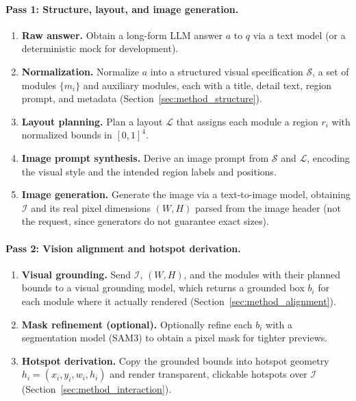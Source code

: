 \paragraph{Pass 1: Structure, layout, and image generation.}
\begin{enumerate}[leftmargin=*,topsep=2pt,itemsep=1pt]
    \item \textbf{Raw answer.} Obtain a long-form LLM answer $a$ to $q$ via a
    text model (or a deterministic mock for development).
    \item \textbf{Normalization.} Normalize $a$ into a structured visual
    specification $\mathcal{S}$, a set of modules $\{m_i\}$ and auxiliary
    modules, each with a title, detail text, region prompt, and metadata
    (Section~\ref{sec:method_structure}).
    \item \textbf{Layout planning.} Plan a layout $\mathcal{L}$ that assigns
    each module a region $r_i$ with normalized bounds in $[0,1]^4$.
    \item \textbf{Image prompt synthesis.} Derive an image prompt from
    $\mathcal{S}$ and $\mathcal{L}$, encoding the visual style and the
    intended region labels and positions.
    \item \textbf{Image generation.} Generate the image via a text-to-image
    model, obtaining $\mathcal{I}$ and its real pixel dimensions
    $(W, H)$ parsed from the image header (not the request, since generators
    do not guarantee exact sizes).
\end{enumerate}

\paragraph{Pass 2: Vision alignment and hotspot derivation.}
\begin{enumerate}[leftmargin=*,topsep=2pt,itemsep=1pt,resume]
    \item \textbf{Visual grounding.} Send $\mathcal{I}$, $(W,H)$, and the
    modules with their planned bounds to a visual grounding model, which
    returns a grounded box $b_i$ for each module where it actually rendered
    (Section~\ref{sec:method_alignment}).
    \item \textbf{Mask refinement (optional).} Optionally refine each $b_i$
    with a segmentation model (SAM3) to obtain a pixel mask for tighter
    previews.
    \item \textbf{Hotspot derivation.} Copy the grounded bounds into hotspot
    geometry $h_i = (x_i, y_i, w_i, h_i)$ and render transparent, clickable
    hotspots over $\mathcal{I}$ (Section~\ref{sec:method_interaction}).
\end{enumerate}

